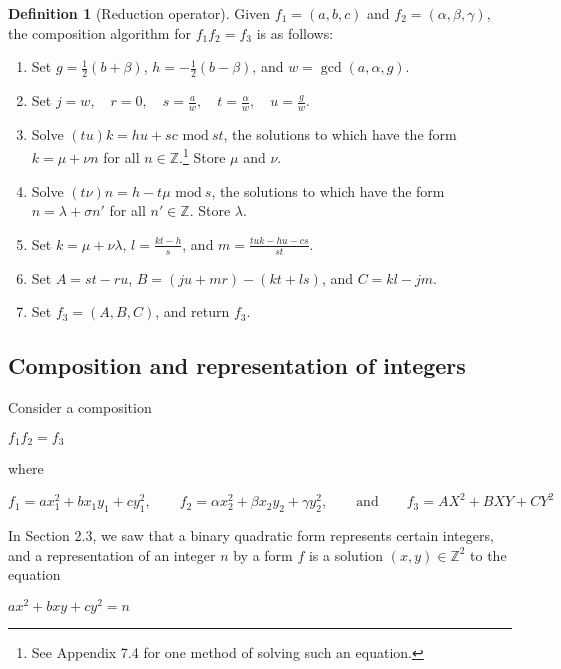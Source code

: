 \documentclass{article}
\theoremstyle{definition}
\newtheorem{definition}{Definition}[section]
\theoremstyle{theorem}
\theoremstyle{example}
\theoremstyle{corollary}
\begin{document}
\begin{definition}[Reduction operator]
Given \(f_{1} = (a, b, c)\) and \(f_{2} = (\alpha, \beta, \gamma)\), the composition algorithm for \(f_{1} f_{2} = f_{3}\) is as follows:
\begin{enumerate}
\item Set \(g = \frac{1}{2} (b + \beta)\), \(h = - \frac{1}{2} (b - \beta)\), and \(w = \gcd(a, \alpha, g)\).
\item Set \(j = w, \quad r = 0, \quad s = \frac{a}{w}, \quad t = \frac{\alpha}{w}, \quad u = \frac{g}{w}\).
\item Solve \((tu)k = hu + sc \, \, \textrm{mod} \ st\), the solutions to which have the form \(k = \mu + \nu n\) for all \(n \in \mathbb{Z}\).\footnote{See Appendix 7.4 for one method of solving such an equation.} Store \(\mu\) and \(\nu\).
\item Solve \((t\nu)n = h - t\mu \, \, \textrm{mod} \ s\), the solutions to which have the form \(n = \lambda + \sigma n'\) for all \(n' \in \mathbb{Z}\). Store \(\lambda\).
\item Set \(k = \mu + \nu \lambda\), \(l = \frac{kt - h}{s}\), and \(m = \frac{tuk - hu - cs}{st}\).
\item Set \(A = s t - r u\), \(B = (j u + m r) - (k t + l s)\), and \(C = k l - j m\).
\item Set \(f_{3} = (A, B, C)\), and return \(f_{3}\).
\end{enumerate}






\bigskip

\subsection{Composition and representation of integers}

\bigskip

Consider a composition
\begin{center}
\(f_{1} f_{2} = f_{3}\)
\end{center}
where
\begin{center}
\(f_{1} = a x_{1}^{2} + b x_{1} y_{1} + c y_{1}^{2}, \quad \quad f_{2} = \alpha x_{2}^{2} + \beta x_{2} y_{2} + \gamma y_{2}^{2}, \quad \quad \textrm{and} \quad \quad f_{3} = AX^{2} + BXY + CY^{2}\)
\end{center}

\bigskip

In Section 2.3, we saw that a binary quadratic form represents certain integers, and a representation of an integer \(n\) by a form \(f\) is a solution \((x, y) \in \mathbb{Z}^{2}\) to the equation
\begin{center}
\(ax^{2} + bxy + cy^{2} = n\)
\end{center}


\end{definition}
\end{document}

